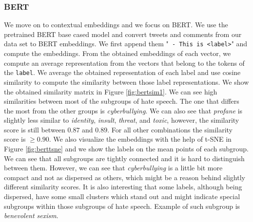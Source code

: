 \documentclass[fleqn,moreauthors,10pt]{ds_report}
\begin{document}
\subsubsection{BERT}
We move on to contextual embeddings and we focus on BERT. We use the pretrained BERT base cased model \cite{dbpl} and convert tweets and comments from our data set to BERT embeddings. We first append them "\texttt{ - This is <label>}" and compute the embeddings. From the obtained embeddings of each vector, we compute an average representation from the vectors that belong to the tokens of the \texttt{label}. We average the obtained representation of each label and use cosine similarity to compute the similarity between those label representations. We show the obtained similarity matrix in Figure \ref{fig:bertsim1}. We can see high similarities between most of the subgroups of hate speech. The one that differs the most from the other groups is \textit{cyberbullying}. We can also see that \textit{profane} is slightly less similar to \textit{identity}, \textit{insult}, \textit{threat}, and \textit{toxic}, however, the similarity score is still between $0.87$ and $0.89$. For all other combinations the similarity score is $\ge 0.90$. We also visualize the embeddings with the help of t-SNE in Figure \ref{fig:berttsne} and we show the labels on the mean points of each subgroup. We can see that all subgroups are tightly connected and it is hard to distinguish between them. However, we can see that \textit{cyberbullying} is a little bit more compact and not as dispersed as others, which might be a reason behind slightly different similarity scores. It is also interesting that some labels, although being dispersed, have some small clusters which stand out and might indicate special subgroups within those subgroups of hate speech. Example of such subgroup is \textit{benevolent sexism}.
\end{document}
